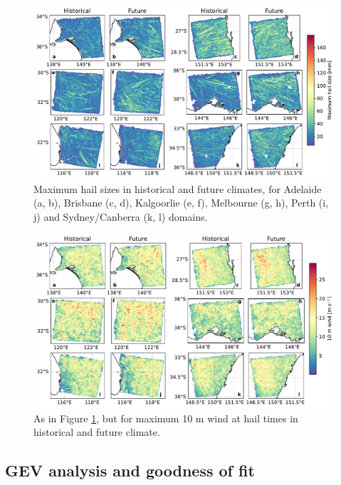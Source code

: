 \documentclass[]{agujournal2019}\usepackage[]{graphicx}\usepackage[]{xcolor}
\begin{document}
\begin{figure}[!ht]
      \includegraphics[width=\textwidth]{figures/max_hail_sizes_by_domain}
      \caption{Maximum hail sizes in historical and future climates, for Adelaide (a, b), Brisbane (c, d), Kalgoorlie (e, f), Melbourne (g, h), Perth (i, j) and Sydney/Canberra (k, l) domains.}
      \label{fig:max_hail_sizes_by_domain}
\end{figure}

\begin{figure}[!ht]
      \includegraphics[width=\textwidth]{figures/max_10m_winds_by_domain}
      \caption{As in Figure \ref{fig:max_hail_sizes_by_domain}, but for maximum 10 m wind at hail times in historical and future climate.}
      \label{fig:max_wind_by_domain}
\end{figure}

\subsection{GEV analysis and goodness of fit}
\end{document}
